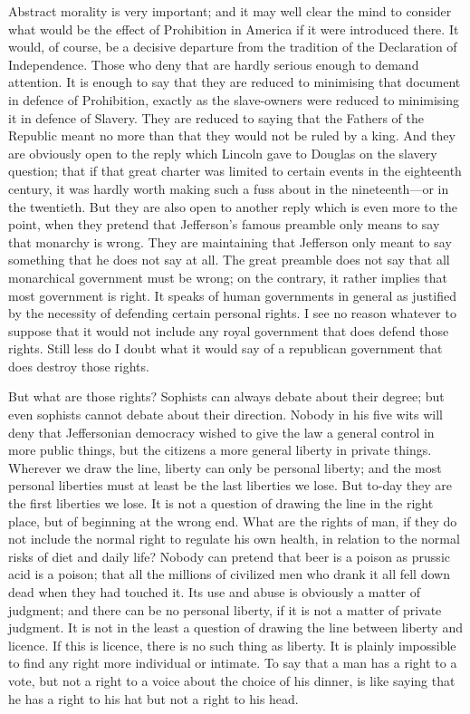 \documentclass{book}
\begin{document}
Abstract morality is very important; and it may well clear the mind to consider what would be the effect of Prohibition in America if it were introduced there. It would, of course, be a decisive departure from the tradition of the Declaration of Independence. Those who deny that are hardly serious enough to demand attention. It is enough to say that they are reduced to minimising that document in defence of Prohibition, exactly as the slave-owners were reduced to minimising it in defence of Slavery. They are reduced to saying that the Fathers of the Republic meant no more than that they would not be ruled by a king. And they are obviously open to the reply which Lincoln gave to Douglas on the slavery question; that if that great charter was limited to certain events in the eighteenth century, it was hardly worth making such a fuss about in the nineteenth—or in the twentieth. But they are also open to another reply which is even more to the point, when they pretend that Jefferson’s famous preamble only means to say that monarchy is wrong. They are maintaining that Jefferson only meant to say something that he does not say at all. The great preamble does not say that all monarchical government must be wrong; on the contrary, it rather implies that most government is right. It speaks of human governments in general as justified by the necessity of defending certain personal rights. I see no reason whatever to suppose that it would not include any royal government that does defend those rights. Still less do I doubt what it would say of a republican government that does destroy those rights.

But what are those rights? Sophists can always debate about their degree; but even sophists cannot debate about their direction. Nobody in his five wits will deny that Jeffersonian democracy wished to give the law a general control in more public things, but the citizens a more general liberty in private things. Wherever we draw the line, liberty can only be personal liberty; and the most personal liberties must at least be the last liberties we lose. But to-day they are the first liberties we lose. It is not a question of drawing the line in the right place, but of beginning at the wrong end. What are the rights of man, if they do not include the normal right to regulate his own health, in relation to the normal risks of diet and daily life? Nobody can pretend that beer is a poison as prussic acid is a poison; that all the millions of civilized men who drank it all fell down dead when they had touched it. Its use and abuse is obviously a matter of judgment; and there can be no personal liberty, if it is not a matter of private judgment. It is not in the least a question of drawing the line between liberty and licence. If this is licence, there is no such thing as liberty. It is plainly impossible to find any right more individual or intimate. To say that a man has a right to a vote, but not a right to a voice about the choice of his dinner, is like saying that he has a right to his hat but not a right to his head.
\end{document}
